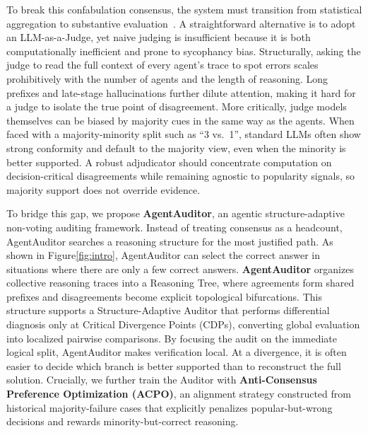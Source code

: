 \documentclass{article}
\theoremstyle{plain}
\theoremstyle{definition}
\theoremstyle{remark}
\begin{document}
To break this confabulation consensus, the system must transition from statistical aggregation to substantive evaluation~\citep{zhou2025reso,wang2024self,xu2025scalable,li2024verco,adewumi2024limitations}. A straightforward alternative is to adopt an LLM-as-a-Judge, yet naive judging is insufficient because it is both computationally inefficient and prone to sycophancy bias. Structurally, asking the judge to read the full context of every agent's trace to spot errors scales prohibitively with the number of agents and the length of reasoning. Long prefixes and late-stage hallucinations further dilute attention, making it hard for a judge to isolate the true point of disagreement. 
More critically, judge models themselves can be biased by majority cues in the same way as the agents.
When faced with a majority-minority split such as ``3 vs.\ 1'', standard LLMs often show strong conformity and default to the majority view, even when the minority is better supported. A robust adjudicator should concentrate computation on decision-critical disagreements while remaining agnostic to popularity signals, so majority support does not override evidence.


To bridge this gap, we propose \textbf{AgentAuditor}, an agentic structure-adaptive non-voting auditing framework. Instead of treating consensus as a headcount, AgentAuditor searches a reasoning structure for the most justified path. As shown in Figure\ref{fig:intro}, AgentAuditor can select the correct answer in situations where there are only a few correct answers. \textbf{AgentAuditor} organizes collective reasoning traces into a Reasoning Tree, where agreements form shared prefixes and disagreements become explicit topological bifurcations. 
This structure supports a Structure-Adaptive Auditor that performs differential diagnosis only at Critical Divergence Points (CDPs), converting global evaluation into localized pairwise comparisons. 
By focusing the audit on the immediate logical split, AgentAuditor makes verification local. At a divergence, it is often easier to decide which branch is better supported than to reconstruct the full solution.
Crucially, we further train the Auditor with \textbf{Anti-Consensus Preference Optimization (ACPO)}, an alignment strategy constructed from historical majority-failure cases that explicitly penalizes popular-but-wrong decisions and rewards minority-but-correct reasoning. 
\end{document}
